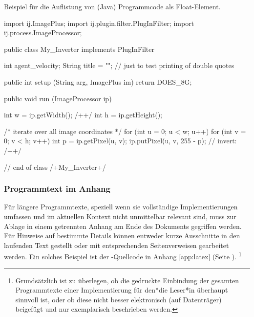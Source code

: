 \begin{program}
\caption{Beispiel für die Auflistung von (Java) Programmcode als Float-Element.}
\label{prog:CodeExample}
\begin{JavaCode}
import ij.ImagePlus;
import ij.plugin.filter.PlugInFilter;
import ij.process.ImageProcessor;

public class My_Inverter implements PlugInFilter {
	int agent_velocity;
	String title = ""; 				// just to test printing of double quotes

	public int setup (String arg, ImagePlus im) {
		return DOES_8G;
	}

	public void run (ImageProcessor ip) {
		int w = ip.getWidth(); /+\label{ExampleCodeLabel}+/
		int h = ip.getHeight();

		/* iterate over all image coordinates */
		for (int u = 0; u < w; u++) {
			for (int v = 0; v < h; v++) {
				int p = ip.getPixel(u, v);
				ip.putPixel(u, v, 255 - p); // invert: /+\label{MathInCode}+/
			}
		}
	}
} // end of class /+My\_Inverter+/
\end{JavaCode}
%
\end{program}


\subsubsection{Programmtext im Anhang}

Für längere Programmtexte, speziell wenn sie vollständige Implementierungen
umfassen und im aktuellen Kontext nicht unmittelbar relevant sind, muss zur
Ablage in einem getrennten Anhang am Ende des Dokuments gegriffen werden. Für
Hinweise auf bestimmte Details können entweder kurze Ausschnitte in den
laufenden Text gestellt oder mit entsprechenden Seitenverweisen gearbeitet
werden. Ein solches Beispiel ist der \latex-Quellcode in Anhang
\ref{app:latex} (Seite \pageref{app:latex}).%
\footnote{Grundsätzlich ist zu überlegen, ob die gedruckte Einbindung der
gesamten Programmtexte einer Implementierung für den*die Leser*in überhaupt
sinnvoll ist, oder ob diese nicht besser elektronisch (auf Datenträger)
beigefügt und nur exemplarisch beschrieben werden.}

